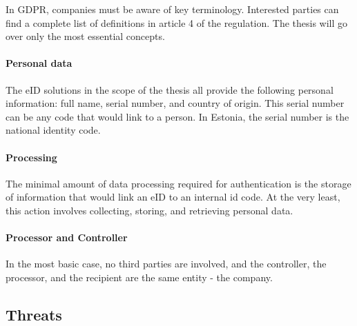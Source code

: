 In GDPR, companies must be aware of key terminology. Interested parties can find a complete list of definitions in article 4 of the regulation. The thesis will go over only the most essential concepts.

\paragraph{Personal data} The eID solutions in the scope of the thesis all provide the following personal information: full name, serial number, and country of origin. This serial number can be any code that would link to a person. In Estonia, the serial number is the national identity code.

\paragraph{Processing} The minimal amount of data processing required for authentication is the storage of information that would link an eID to an internal id code. At the very least, this action involves collecting, storing, and retrieving personal data.

\paragraph{Processor and Controller} In the most basic case, no third parties are involved, and the controller, the processor, and the recipient are the same entity - the company.

\subsection{Threats}


